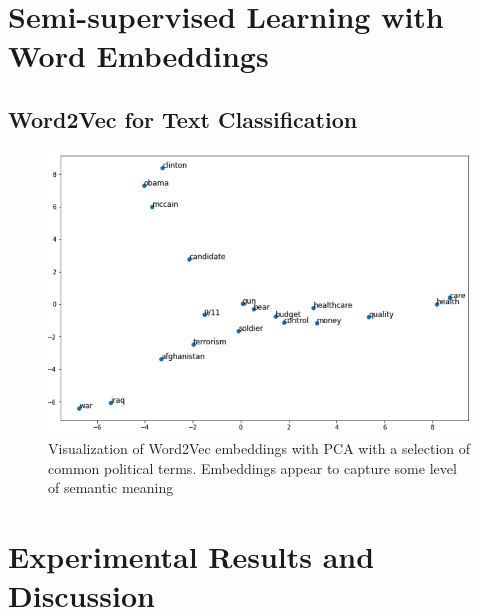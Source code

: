 \documentclass[11pt,a4paper]{article}
\begin{document}
\section{Semi-supervised Learning with Word Embeddings}%
\label{sec:semi_supervised_learning_with_word_embeddings}


\subsection{Word2Vec for Text Classification}%
\label{sub:word2vec_for_text_classification}

\begin{figure}[htpb]
  \centering
  \includegraphics[width=1\linewidth]{imgs/w2v_pca.png}
  \caption{Visualization of Word2Vec embeddings with PCA with a selection 
  of common political terms. Embeddings appear to capture some level of 
semantic meaning}%
  \label{fig:imgs/w2v_pca}
\end{figure}








\section{Experimental Results and Discussion}%
\label{sec:experimental_results_and_discussion}
\end{document}
